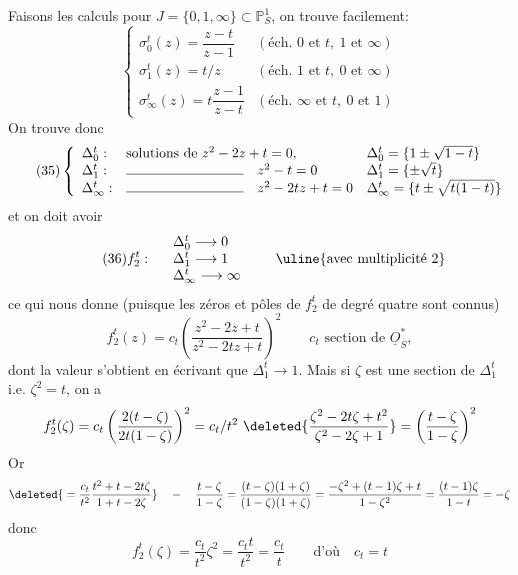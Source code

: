Faisons les calculs pour $J=\{0,1,\infty\}\subset\mathbb P^1_S$, on trouve facilement:
\[
\tag{34}\left\{\begin{array}{ll}
\sigma_0^t(z)=\dfrac{z-t}{z-1}&(\text{éch. }0\text{ et }t,\ 1\text{ et }\infty)\\
\sigma_1^t(z)=t/z&(\text{éch. }1\text{ et }t,\ 0\text{ et }\infty)\\
\sigma_\infty^t(z)=t\dfrac{z-1}{z-t}&(\text{éch. }\infty\text{ et }t,\ 0\text{ et }1)
\end{array}\right.
\]
On trouve donc
\[
\tag{35}\left\{\begin{array}{lll}
\Delta_0^t:&\text{solutions de }z^2-2z+t=0,&\Delta_0^t=\{1\pm\sqrt{1-t}\}\\
\Delta_1^t:&\text{\rule{3cm}{0.4pt}}\quad z^2-t=0&\Delta_1^t=\{\pm\sqrt t\}\\
\Delta_\infty^t:&\text{\rule{3cm}{0.4pt}}\quad z^2-2tz+t=0&\Delta_\infty^t=\{t\pm\sqrt{t(1-t)}\}
\end{array}\right.
\]
et on doit avoir
\[
\tag{36}f_2^t:\quad\begin{array}{l}
\Delta_0^t\longrightarrow0\\
\Delta_1^t\longrightarrow1\\
\Delta_\infty^t\longrightarrow\infty
\end{array}\qquad\uline{\text{avec multiplicité }2}
\]
ce qui nous donne (puisque les zéros et pôles de $f_2^t$ de degré quatre sont connus)
\[
f_2^t(z)=c_t\left(\frac{z^2-2z+t}{z^2-2tz+t}\right)^2\qquad c_t\text{ section de }\underline O_S^*,
\]
dont la valeur s'obtient en écrivant que $\Delta_1^t\longrightarrow1$. Mais si $\zeta$ est une section de $\Delta_1^t$ i.e. $\zeta^2=t$, on a
\[
f_2^t(\zeta)=c_t\left(\frac{2(t-\zeta)}{2t(1-\zeta)}\right)^2
=c_t/t^2\ \deleted{\frac{\zeta^2-2t\zeta+t^2}{\zeta^2-2\zeta+1}}
=\left(\frac{t-\zeta}{1-\zeta}\right)^2
\]
Or
\[
\deleted{{}=\frac{c_t}{t^2}\frac{t^2+t-2t\zeta}{1+t-2\zeta}}\quad-
\quad\frac{t-\zeta}{1-\zeta}
=\frac{(t-\zeta)(1+\zeta)}{(1-\zeta)(1+\zeta)}
=\frac{-\zeta^2+(t-1)\zeta+t}{1-\zeta^2}
=\frac{(t-1)\zeta}{1-t}=-\zeta
\]
donc
\[
f_2^t(\zeta)=\frac{c_t}{t^2}\zeta^2=\frac{c_t t}{t^2}=\frac{c_t}{t}\qquad\text{d'où}\quad c_t=t
\]
